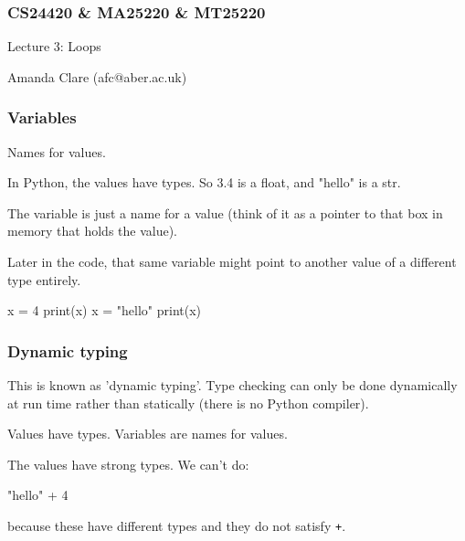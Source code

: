 \documentclass{beamer}
\begin{document}

\begin{frame}
\frametitle{CS24420 \& MA25220 \& MT25220}

\begin{center}
\begin{huge}
Lecture 3: Loops
\end{huge}
\bigskip

Amanda Clare (afc@aber.ac.uk)

\end{center}
\end{frame}



\begin{frame}[fragile]
\frametitle{Variables}
Names for values. 

\bigskip

In Python, the values have types. So 3.4 is a float,
and "hello" is a str. 

\bigskip

The variable is just a name for a value (think
of it as a pointer to that box in memory that holds the value). 

\bigskip

Later in the code, that same variable might point to another value of
a different type entirely.

\begin{code}
x = 4
print(x)
x = "hello"
print(x)
\end{code}

\end{frame}



\begin{frame}[fragile]
\frametitle{Dynamic typing}
This is known as 'dynamic typing'. Type checking can only be done
dynamically at
run time rather than statically (there is no Python compiler). 
 
\bigskip

Values have types. Variables are names for values.

\bigskip

The values have strong types. We can't do: 
\begin{code}
"hello" + 4

\end{code}

because these have different types and they do not satisfy \texttt{+}.
\end{frame}
\end{document}
